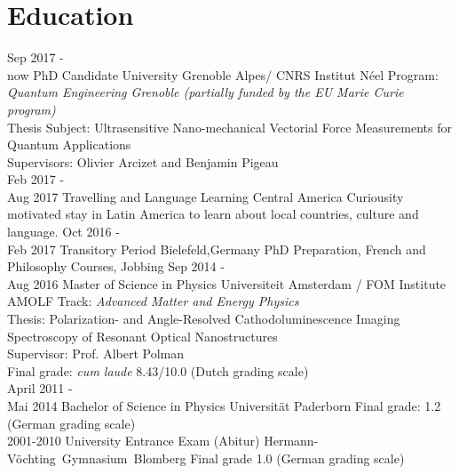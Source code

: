 \documentclass[10pt, print]{friggeri-cv}
\begin{document}
\section{Education}
\begin{entrylist}
  \entry
  {Sep 2017 -\\ now}
  {PhD Candidate}
  {University Grenoble Alpes/ CNRS Institut Néel}
  {\small Program: \emph{Quantum Engineering Grenoble (partially funded by the EU Marie Curie program)}\\\small Thesis Subject: {Ultrasensitive Nano-mechanical Vectorial Force
      Measurements for Quantum Applications}\\
  Supervisors: Olivier Arcizet and Benjamin Pigeau\\}%
  \entry
  {Feb 2017 -\\ Aug 2017}
  {Travelling and Language Learning}
  {Central America}
  {\small Curiousity motivated stay in Latin America to learn about local countries, culture and language.}
  \entry
      {Oct 2016 -\\ Feb 2017}
      {Transitory Period}
      {Bielefeld,Germany}
      {\small PhD Preparation, French and Philosophy Courses, Jobbing}
  \entry
  {Sep 2014 -\\ Aug 2016}
  {Master of Science  in Physics}
  {Universiteit Amsterdam / FOM Institute AMOLF}
  {\small Track: \emph{Advanced Matter and Energy Physics}\\
  	 \small Thesis: Polarization- and Angle-Resolved Cathodoluminescence Imaging Spectroscopy of Resonant Optical Nanostructures\\
  	 \small Supervisor: Prof. Albert Polman\\
  	\small Final grade: {\textnormal{\textit{cum laude}}} 8.43/10.0 (Dutch grading scale)\\}
  \entry
  {April 2011 -\\ Mai 2014}
  {Bachelor of Science in Physics}
  {Universität Paderborn}
  {
  	 \small Final grade: 1.2 (German grading scale)\\}
  \entry
  {2001-2010}
  {University Entrance Exam (Abitur)}
  {Hermann-Vöchting~Gymnasium~Blomberg}
  {\small Final grade 1.0 (German grading scale)\\}
\end{entrylist}
\end{document}
